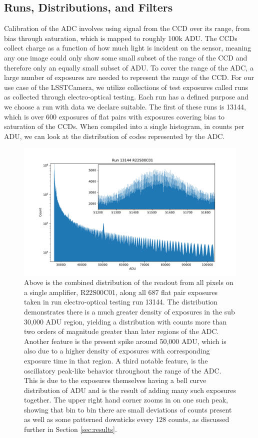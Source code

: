 \documentclass[11pt, letterpaper]{article}
\begin{document}
\subsection{Runs, Distributions, and Filters}
\label{sec: RDF}
\indent

Calibration of the ADC involves using signal from the CCD over its range, from bias through saturation, which is mapped to roughly 100k ADU. 
The CCDs collect charge as a function of how much light is incident on the sensor, meaning any one image could only show some small subset of the range of the CCD and therefore only an equally small subset of ADU.
To cover the range of the ADC, a large number of exposures are needed to represent the range of the CCD. 
For our use case of the LSSTCamera, we utilize collections of test exposures called runs as collected through electro-optical testing. 
Each run has a defined purpose and we choose a run with data we declare suitable. 
The first of these runs is 13144, which is over 600 exposures of flat pairs with exposures covering bias to saturation of the CCDs. 
When compiled into a single histogram, in counts per ADU, we can look at the distribution of codes represented by the ADC.  

\begin{figure}
    \centering
    \includegraphics[width=0.5\linewidth]{bar1.pdf}
    \caption{Above is the combined distribution of the readout from all pixels on a single amplifier, R22S00C01, along all 687 flat pair exposures taken in run electro-optical testing run 13144. The distribution demonstrates there is a much greater density of exposures in the sub 30,000 ADU region, yielding a distribution with counts more than two orders of magnitude greater than later regions of the ADC. Another feature is the present spike around 50,000 ADU, which is also due to a higher density of exposures with corresponding exposure time in that region. A third notable feature, is the oscillatory peak-like behavior throughout the range of the ADC. This is due to the exposures themselves having a bell curve distribution of ADU and is the result of adding many such exposures together. The upper right hand corner zooms in on one such peak, showing that bin to bin there are small deviations of counts present as well as some patterned downticks every 128 counts, as discussed further in Section \ref{sec:results}.}
    \label{fig:unscaled13144}
\end{figure}
\end{document}
